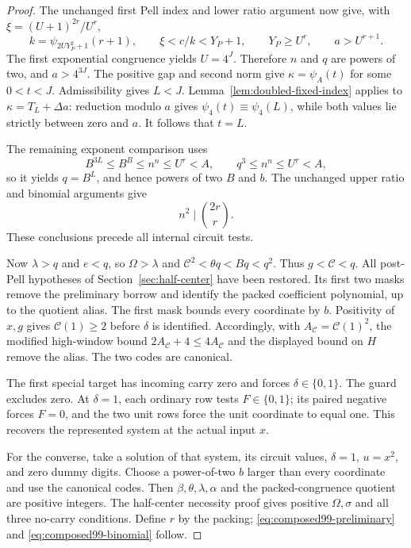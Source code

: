 \begin{proof}
The unchanged first Pell index and lower ratio argument now give,
with $\xi=(U+1)^{2r}/U^r$,
\[
 k=\psi_{2UY_P^2+1}(r+1),\qquad
 \xi<c/k<Y_P+1,\qquad
 Y_P\ge U^r,\qquad a>U^{r+1}.
\]
The first exponential congruence yields $U=4^J$. Therefore $n$ and
$q$ are powers of two, and $a>4^{3J}$.
The positive gap and second norm give
$\kappa=\psi_A(t)$ for some $0<t<J$. Admissibility gives
$L<J$. Lemma~\ref{lem:doubled-fixed-index} applies to
$\kappa=T_L+\Delta a$: reduction modulo $a$ gives
$\psi_4(t)\equiv\psi_4(L)$, while both values lie strictly between
zero and $a$. It follows that $t=L$.

The remaining exponent comparison uses
\[
 B^{3L}\le B^B\le n^n\le U^r<A,
 \qquad q^3\le n^n\le U^r<A,
\]
so it yields $q=B^L$, and hence powers of two $B$ and $b$.
The unchanged upper ratio and binomial arguments give
\begin{equation}\label{eq:composed99-binomial}
 n^2\mid\binom{2r}{r}.
\end{equation}
These conclusions precede all internal circuit tests.

Now $\lambda>q$ and $e<q$, so $\Omega>\lambda$ and
$\mathcal C^2<\theta q<Bq<q^2$. Thus $g<\mathcal C<q$.
All post-Pell hypotheses of Section~\ref{sec:half-center} have been
restored. Its first two masks remove the preliminary borrow and
identify the packed coefficient polynomial, up to the quotient alias.
The first mask bounds every coordinate by $b$. Positivity of $x,g$
gives $\mathcal C(1)\ge2$ before $\delta$ is identified. Accordingly,
with $A_{\mathcal C}=\mathcal C(1)^2$, the modified high-window bound
$2A_{\mathcal C}+4\le4A_{\mathcal C}$ and the displayed bound on $H$
remove the alias. The two codes are canonical.

The first special target has incoming carry zero and forces
$\delta\in\{0,1\}$. The guard excludes zero. At $\delta=1$, each
ordinary row tests $F\in\{0,1\}$; its paired negative forces $F=0$,
and the two unit rows force the unit coordinate to equal one.
This recovers the represented system at the actual input $x$.

For the converse, take a solution of that system, its circuit values,
$\delta=1$, $u=x^2$, and zero dummy digits. Choose a power-of-two
$b$ larger than every coordinate and use the canonical codes.
Then $\beta,\theta,\lambda,\alpha$ and the packed-congruence quotient
are positive integers. The half-center necessity proof gives positive
$\Omega,\sigma$ and all three no-carry conditions. Define $r$ by
the packing; \eqref{eq:composed99-preliminary} and
\eqref{eq:composed99-binomial} follow.


\end{proof}
